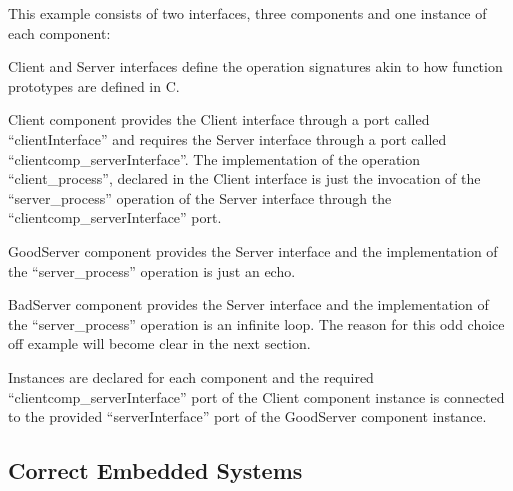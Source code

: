 This example consists of two interfaces, three components and one instance of each component:
\begin{compactdesc}
\item[Client and Server interfaces] define the operation signatures akin to how function prototypes are defined in C.
\item[Client component] provides the Client interface through a port called ``clientInterface'' and requires the Server interface through a port called ``clientcomp\_serverInterface''. The implementation of the operation ``client\_process'', declared in the Client interface is just the invocation of the ``server\_process'' operation of the Server interface through the ``clientcomp\_serverInterface'' port.
\item[GoodServer component] provides the Server interface and the implementation of the ``server\_process'' operation is just an echo.
\item[BadServer component] provides the Server interface and the implementation of the ``server\_process'' operation is an infinite loop. The reason for this odd choice off example will become clear in the next section.
\item[Instances] are declared for each component and the required ``clientcomp\_serverInterface'' port of the Client component instance is connected to the provided ``serverInterface'' port of the GoodServer component instance.
\end{compactdesc}


\subsection{Correct Embedded Systems}















































